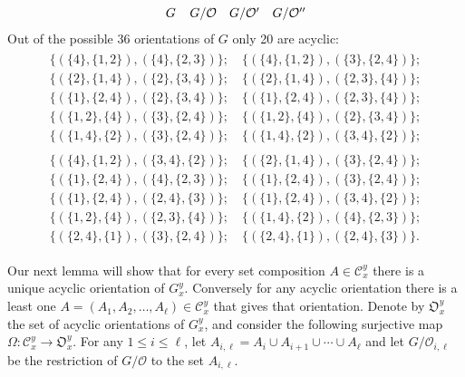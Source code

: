 \documentclass[ALCO,ThmDefs,Unicode,epreuves]{cedram}
\begin{document}
\begin{exam}
$$\begin{array}{cccc}
\begin{tikzpicture}[scale=.7,baseline=.2cm]
\end{tikzpicture} \quad\\
G&G/\mathcal{O}&G/\mathcal{O}'&G/\mathcal{O}''\\
\end{array}
$$
Out of the possible 36 orientations of $G$ only 20 are acyclic:
$$ 
\begin{gathered}
\begin{array}{c}
\{ (\{4\},\{1,2\}),(\{4\},\{2,3\})\};\quad \{ (\{4\},\{1,2\}),(\{3\},\{2,4\})\};\\[1pt]
 \{ (\{2\},\{1,4\}),(\{2\},\{3,4\})\};\quad \{ (\{2\},\{1,4\}),(\{2,3\},\{4\})\};\\[1pt]
\{ (\{1\},\{2,4\}),(\{2\},\{3,4\})\};\quad\{ (\{1\},\{2,4\}),(\{2,3\},\{4\})\};\\[1pt]
\{ (\{1,2\},\{4\}),(\{3\},\{2,4\})\};\quad\{ (\{1,2\},\{4\}),(\{2\},\{3,4\})\};\\[1pt]
\{ (\{1,4\},\{2\}),(\{3\},\{2,4\})\};\quad\{ (\{1,4\},\{2\}),(\{3,4\},\{2\})\};
\end{array}
\\[6pt]
\begin{array}{c}
\{ (\{4\},\{1,2\}),(\{3,4\},\{2\})\};\quad \{ (\{2\},\{1,4\}),(\{3\},\{2,4\})\};\\[1pt]
\{ (\{1\},\{2,4\}),(\{4\},\{2,3\})\};\quad\{ (\{1\},\{2,4\}),(\{3\},\{2,4\})\};\\[1pt]
\{ (\{1\},\{2,4\}),(\{2,4\},\{3\})\};\quad\{ (\{1\},\{2,4\}),(\{3,4\},\{2\})\};\\[1pt]
\{ (\{1,2\},\{4\}),(\{2,3\},\{4\})\};\quad\{ (\{1,4\},\{2\}),(\{4\},\{2,3\})\};\\[1pt]
\{ (\{2,4\},\{1\}),(\{3\},\{2,4\})\};\quad\{ (\{2,4\},\{1\}),(\{2,4\},\{3\})\}.
\end{array}
\end{gathered}
$$
\end{exam}


Our next lemma will show that for every set composition $A\in \mathcal{C}_{x}^{y}$ there is a unique acyclic orientation of $G_x^y$. Conversely for any acyclic orientation there is a least one $A=(A_1,A_2,\ldots, A_\ell)\in \mathcal{C}_{x}^{y}$ that gives that orientation. Denote by $\mathfrak{O}_x^y$ the set of acyclic orientations of $G_x^y$, and consider the following surjective
map $\Omega\colon \mathcal{C}_{x}^{y} \to \mathfrak{O}_x^y$.
For any $1\le i\le\ell$, let $A_{i,\ell}=A_i\cup A_{i+1}\cup\cdots\cup A_\ell$ and let $G/\mathcal{O}_{i,\ell}$ be the restriction of $G/\mathcal{O}$ to the set $A_{i,\ell}$.
\end{document}
